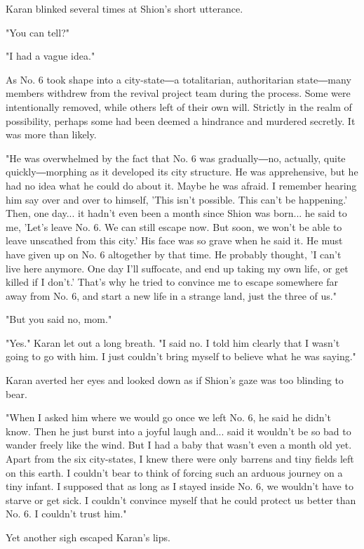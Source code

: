 Karan blinked several times at Shion's short utterance.

"You can tell?"

"I had a vague idea."

As No. 6 took shape into a city-state―a totalitarian, authoritarian
state―many members withdrew from the revival project team during the
process. Some were intentionally removed, while others left of their own
will. Strictly in the realm of possibility, perhaps some had been deemed
a hindrance and murdered secretly. It was more than likely.

"He was overwhelmed by the fact that No. 6 was gradually―no, actually,
quite quickly―morphing as it developed its city structure. He was
apprehensive, but he had no idea what he could do about it. Maybe he was
afraid. I remember hearing him say over and over to himself, 'This isn't
possible. This can't be happening.' Then, one day... it hadn't even been
a month since Shion was born... he said to me, 'Let's leave No. 6. We
can still escape now. But soon, we won't be able to leave unscathed from
this city.' His face was so grave when he said it. He must have given up
on No. 6 altogether by that time. He probably thought, 'I can't live
here anymore. One day I'll suffocate, and end up taking my own life, or
get killed if I don't.' That's why he tried to convince me to escape
somewhere far away from No. 6, and start a new life in a strange land,
just the three of us."

"But you said no, mom."

"Yes." Karan let out a long breath. "I said no. I told him clearly that
I wasn't going to go with him. I just couldn't bring myself to believe
what he was saying."

Karan averted her eyes and looked down as if Shion's gaze was too
blinding to bear.

"When I asked him where we would go once we left No. 6, he said he
didn't know. Then he just burst into a joyful laugh and... said it
wouldn't be so bad to wander freely like the wind. But I had a baby that
wasn't even a month old yet. Apart from the six city-states, I knew
there were only barrens and tiny fields left on this earth. I couldn't
bear to think of forcing such an arduous journey on a tiny infant. I
supposed that as long as I stayed inside No. 6, we wouldn't have to
starve or get sick. I couldn't convince myself that he could protect us
better than No. 6. I couldn't trust him."

Yet another sigh escaped Karan's lips.

